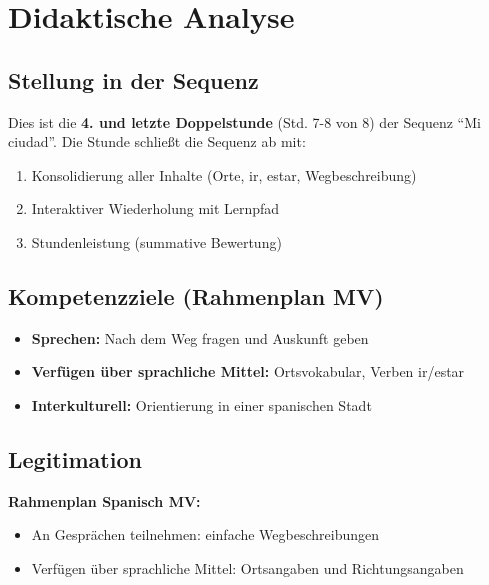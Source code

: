 \documentclass[11pt,a4paper]{article}
\newcommand{\reihenthema}{Mi ciudad}
\begin{document}
\section{Didaktische Analyse}

\subsection{Stellung in der Sequenz}
Dies ist die \textbf{4. und letzte Doppelstunde} (Std. 7-8 von 8) der Sequenz ``\reihenthema''.
Die Stunde schließt die Sequenz ab mit:
\begin{enumerate}
    \item Konsolidierung aller Inhalte (Orte, ir, estar, Wegbeschreibung)
    \item Interaktiver Wiederholung mit Lernpfad
    \item Stundenleistung (summative Bewertung)
\end{enumerate}

\subsection{Kompetenzziele (Rahmenplan MV)}
\begin{itemize}
    \item \textbf{Sprechen:} Nach dem Weg fragen und Auskunft geben
    \item \textbf{Verfügen über sprachliche Mittel:} Ortsvokabular, Verben ir/estar
    \item \textbf{Interkulturell:} Orientierung in einer spanischen Stadt
\end{itemize}

\subsection{Legitimation}
\textbf{Rahmenplan Spanisch MV:}
\begin{itemize}
    \item An Gesprächen teilnehmen: einfache Wegbeschreibungen
    \item Verfügen über sprachliche Mittel: Ortsangaben und Richtungsangaben
\end{itemize}

\end{document}
